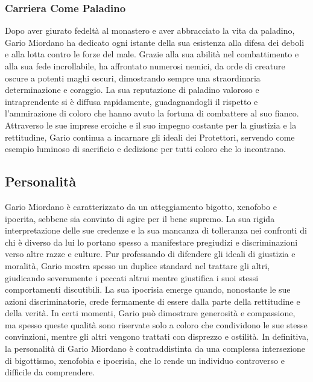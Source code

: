\subsubsection{Carriera Come Paladino}
Dopo aver giurato fedeltà al monastero e aver abbracciato la vita da
paladino, Gario Miordano ha dedicato ogni istante della sua esistenza
alla difesa dei deboli e alla lotta contro le forze del male. Grazie
alla sua abilità nel combattimento e alla sua fede incrollabile, ha
affrontato numerosi nemici, da orde di creature oscure a potenti maghi
oscuri, dimostrando sempre una straordinaria determinazione e coraggio.
La sua reputazione di paladino valoroso e intraprendente si è diffusa
rapidamente, guadagnandogli il rispetto e l'ammirazione di coloro che
hanno avuto la fortuna di combattere al suo fianco. Attraverso le sue
imprese eroiche e il suo impegno costante per la giustizia e la
rettitudine, Gario continua a incarnare gli ideali dei Protettori,
servendo come esempio luminoso di sacrificio e dedizione per tutti
coloro che lo incontrano.

\subsection{Personalità}\label{personalituxe0}


Gario Miordano è caratterizzato da un atteggiamento bigotto, xenofobo e
ipocrita, sebbene sia convinto di agire per il bene supremo. La sua
rigida interpretazione delle sue credenze e la sua mancanza di
tolleranza nei confronti di chi è diverso da lui lo portano spesso a
manifestare pregiudizi e discriminazioni verso altre razze e culture.
Pur professando di difendere gli ideali di giustizia e moralità, Gario
mostra spesso un duplice standard nel trattare gli altri, giudicando
severamente i peccati altrui mentre giustifica i suoi stessi
comportamenti discutibili. La sua ipocrisia emerge quando, nonostante le
sue azioni discriminatorie, crede fermamente di essere dalla parte della
rettitudine e della verità. In certi momenti, Gario può dimostrare
generosità e compassione, ma spesso queste qualità sono riservate solo a
coloro che condividono le sue stesse convinzioni, mentre gli altri
vengono trattati con disprezzo e ostilità. In definitiva, la personalità
di Gario Miordano è contraddistinta da una complessa intersezione di
bigottismo, xenofobia e ipocrisia, che lo rende un individuo controverso
e difficile da comprendere.

